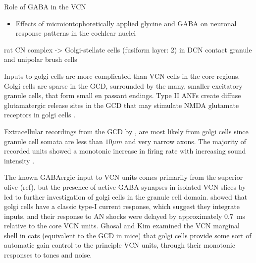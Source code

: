 \medskip{}

Role of GABA in the VCN
\begin{itemize}
\item Effects of microiontophoretically applied glycine and {GABA} on
  neuronal response patterns in the cochlear nuclei
  \citep{CasparyHaveyEtAl:1979}
\end{itemize}
\citep{Alibardi:2003a} rat CN complex -> Golgi-stellate cells
(fusiform layer: 2) in DCN contact granule and unipolar brush cells

\medskip{}

Inputs to golgi cells are more complicated than VCN cells in the core
regions. Golgi cells are sparse in the GCD, surrounded by the many,
smaller excitatory granule cells, that form small en passant
endings. Type II ANFs create diffuse glutamatergic release sites in
the GCD \citep{HurdHutsonEtAl:1999,BensonBrown:2004} that may
stimulate NMDA glutamate receptors in golgi cells
\citep{FerragamoGoldingEtAl:1998a}.

\medskip{}

Extracellular recordings from the GCD by \citet{GhoshalKim:1997}, are
most likely from golgi cells since granule cell somata are less than
$10{}\mu{m}$ and very narrow axons. The majority of recorded units
showed a monotonic increase in firing rate with increasing sound
intensity \citep{GhoshalKim:1997}.

\medskip{}

The known GABAergic input to VCN units comes primarily from the
superior olive (ref), but the presence of active GABA synapses in
isolated VCN slices by \citet{FerragamoGoldingEtAl:1998} led to
further investigation of golgi cells in the granule cell
domain. \citet{FerragamoGoldingEtAl:1998a} showed that golgi cells
have a classic type-I current response, which suggest they integrate
inputs, and their response to AN shocks were delayed by approximately
0.7~ms relative to the core VCN units.  Ghosal and Kim
\citet{GhoshalKim:1997} examined the VCN marginal shell in cats
(equivalent to the GCD in mice) that golgi cells provide some sort of
automatic gain control to the principle VCN units, through their
monotonic responses to tones and noise.

\medskip{}

   
